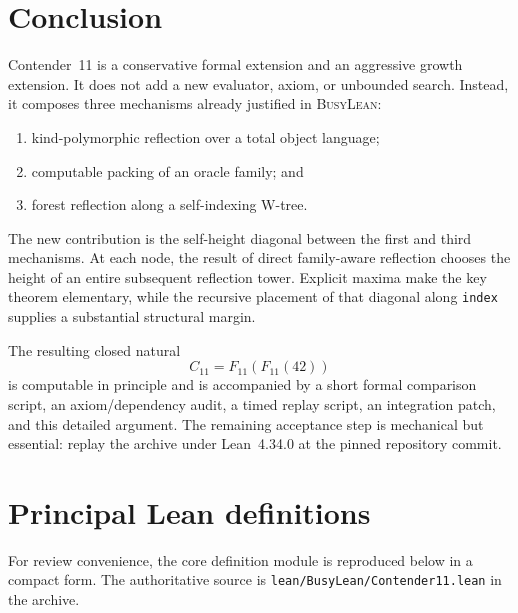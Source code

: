 \documentclass[11pt]{article}
\theoremstyle{definition}
\theoremstyle{remark}
\newcommand{\Celeven}{\ensuremath{C_{11}}}
\newcommand{\code}[1]{\texttt{#1}}
\newcommand{\repo}{\textsc{BusyLean}}
\begin{document}
\section{Conclusion}

Contender~11 is a conservative formal extension and an aggressive growth
extension. It does not add a new evaluator, axiom, or unbounded search. Instead,
it composes three mechanisms already justified in \repo{}:

\begin{enumerate}[leftmargin=*]
\item kind-polymorphic reflection over a total object language;
\item computable packing of an oracle family; and
\item forest reflection along a self-indexing W-tree.
\end{enumerate}

The new contribution is the self-height diagonal between the first and third
mechanisms. At each node, the result of direct family-aware reflection chooses
the height of an entire subsequent reflection tower. Explicit maxima make the
key theorem elementary, while the recursive placement of that diagonal along
\code{index} supplies a substantial structural margin.

The resulting closed natural
\[
  \boxed{\Celeven=F_{11}(F_{11}(42))}
\]
is computable in principle and is accompanied by a short formal comparison
script, an axiom/dependency audit, a timed replay script, an integration patch,
and this detailed argument. The remaining acceptance step is mechanical but
essential: replay the archive under Lean~4.34.0 at the pinned repository commit.

\appendix
\section{Principal Lean definitions}

For review convenience, the core definition module is reproduced below in a
compact form. The authoritative source is
\code{lean/BusyLean/Contender11.lean} in the archive.
\end{document}
